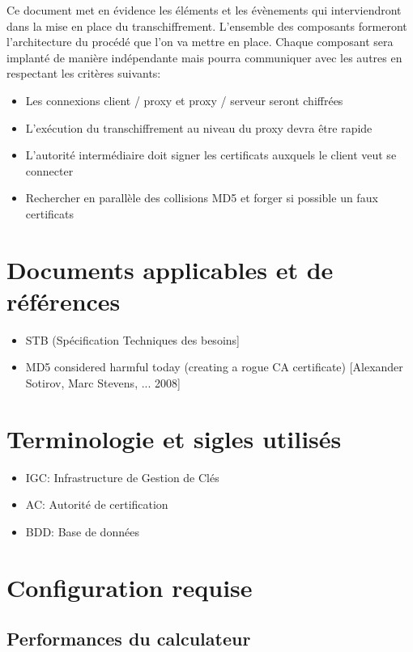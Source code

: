 \documentclass[a4paper,11pt,french]{article}
\begin{document}
Ce document met en évidence les éléments et les évènements qui interviendront dans la mise en place du transchiffrement. L'ensemble des composants formeront l'architecture du procédé que l'on va mettre en place. Chaque composant sera implanté de manière indépendante mais pourra communiquer avec les autres en respectant les critères suivants:

\begin{itemize}
\item Les connexions client / proxy et proxy / serveur seront chiffrées
\item L'exécution du transchiffrement au niveau du proxy devra être rapide
\item L'autorité intermédiaire doit signer les certificats auxquels le client veut se connecter
\item Rechercher en parallèle des collisions MD5 et forger si possible un faux certificats
\end{itemize}


\section{Documents applicables et de références}
\begin{itemize}
\item STB (Spécification Techniques des besoins]
\item MD5 considered harmful today (creating a rogue CA certificate) [Alexander Sotirov, Marc Stevens, ... 2008]
\end{itemize}


\section{Terminologie et sigles utilisés}

\begin{itemize}
\item IGC: Infrastructure de Gestion de Clés
\item AC: Autorité de certification
\item BDD: Base de données
\end{itemize}


\section{Configuration requise}

\subsection{Performances du calculateur}
\end{document}
